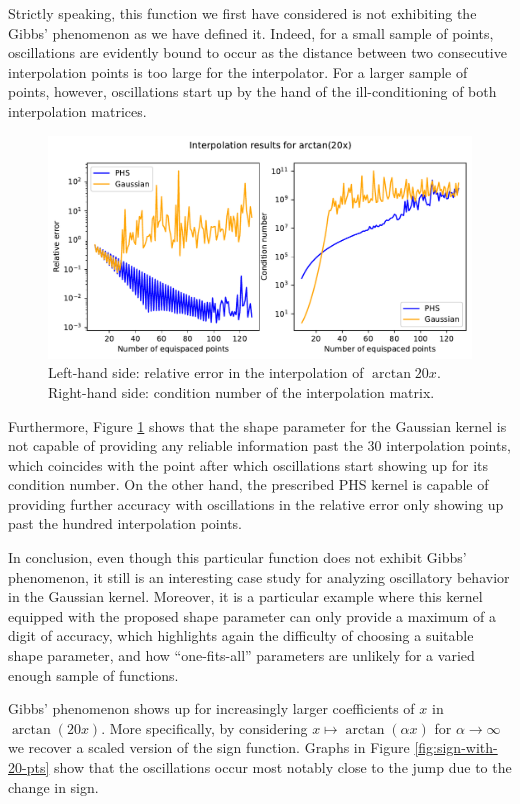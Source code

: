 \documentclass[12pt]{report} %
\begin{document}
Strictly speaking, this function we first have considered is not exhibiting the Gibbs' phenomenon as we have defined it. Indeed, for a small sample of points, oscillations are evidently bound to occur as the distance between two consecutive interpolation points is too large for the interpolator. For a larger sample of points, however, oscillations start up by the hand of the ill-conditioning of both interpolation matrices. 

\begin{figure}[ht]
    \centering
    \includegraphics[width=.8\textwidth]{imagenes/experiments/1d/intro/arctan20x-interpolation-curves.pdf}
    \caption{Left-hand side: relative error in the interpolation of $\arctan{20x}$. Right-hand side: condition number of the interpolation matrix.}
    \label{fig:arctan-with-curves}
\end{figure}

Furthermore, Figure \ref{fig:arctan-with-curves} shows that the shape parameter for the Gaussian kernel is not capable of providing any reliable information past the 30 interpolation points, which coincides with the point after which oscillations start showing up for its condition number. On the other hand, the prescribed PHS kernel is capable of providing further accuracy with oscillations in the relative error only showing up past the hundred interpolation points. 

In conclusion, even though this particular function does not exhibit Gibbs' phenomenon, it still is an interesting case study for analyzing oscillatory behavior in the Gaussian kernel. Moreover, it is a particular example where this kernel equipped with the proposed shape parameter can only provide a maximum of a digit of accuracy, which highlights again the difficulty of choosing a suitable shape parameter, and how ``one-fits-all'' parameters are unlikely for a varied enough sample of functions.

Gibbs' phenomenon shows up for increasingly larger coefficients of $x$ in $\arctan(20x)$. More specifically, by considering $x\mapsto \arctan(\alpha x)$ for $\alpha \to \infty$ we recover a scaled version of the sign function. Graphs in Figure \ref{fig:sign-with-20-pts} show that the oscillations occur most notably close to the jump due to the change in sign.
\end{document}
